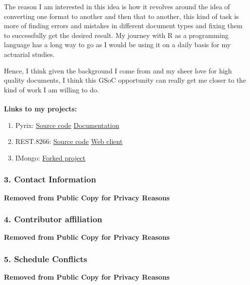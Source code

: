 \documentclass[12pt]{article}
\begin{document}
    The reason I am interested in this idea is how it revolves around the idea of converting one format
to another and then that to another, this kind of task is more of finding errors and mistakes in different document types and fixing them to successfully get the desired result. My journey with R as a programming language has a long way to go as I would be using it on a daily basis for my actuarial studies. 

    Hence, I think given the background I come from and my sheer love for high quality documents, I
think this GSoC opportunity can really get me closer to the kind of work I am willing to do.\\
\\
{\large\bfseries Links to my projects:}\\
\begin{enumerate}[label = {  \color{MediumBlue} \textbf{\arabic*. }},align=left]
 \item Pyrix: \href{https://github.com/Abhi-1U/pyrix}{\color{orange}Source code} \href{https://abhi-1u.github.io/pyrix-docs/}{\color{orange}Documentation}
 \item REST.8266: \href{https://github.com/Abhi-1U/REST.8266}{\color{orange}Source code} \href{https://github.com/Abhi-1U/REST.8266.web.client}{\color{orange}Web client}
 \item IMongo: \href{https://github.com/Abhi-1U/imongo}{\color{orange}Forked project}
\end{enumerate}

\subsubsection{3. Contact Information}
{\large\bfseries Removed from Public Copy for Privacy Reasons} 

\subsubsection{4. Contributor affiliation}
{\large\bfseries Removed from Public Copy for Privacy Reasons} 

\subsubsection{5. Schedule Conflicts}
{\large\bfseries Removed from Public Copy for Privacy Reasons} 
\end{document}
